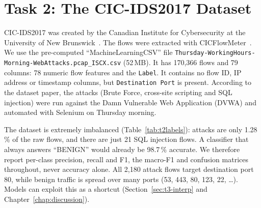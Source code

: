 \chapter{Task 2: The CIC-IDS2017 Dataset}\label{chap:task2_dataset}

CIC-IDS2017 was created by the Canadian Institute for Cybersecurity at the University of New Brunswick~\cite{sharafaldin2018cicids,cicids2017_web}. The flows were extracted with CICFlowMeter~\cite{lashkari2017cicflowmeter}. We use the pre-computed ``MachineLearningCSV'' file \texttt{Thursday-WorkingHours-Morning-WebAttacks.pcap\_ISCX.csv} (52\,MB). It has 170,366 flows and 79 columns: 78 numeric flow features and the \texttt{Label}. It contains no flow ID, IP address or timestamp columns, but \texttt{Destination Port} is present. According to the dataset paper, the attacks (Brute Force, cross-site scripting and SQL injection) were run against the Damn Vulnerable Web Application (DVWA) and automated with Selenium on Thursday morning.

The dataset is extremely imbalanced (Table~\ref{tab:t2labels}): attacks are only 1.28\,\% of the raw flows, and there are just 21 SQL injection flows. A classifier that always answers ``BENIGN'' would already be 98.7\,\% accurate. We therefore report per-class precision, recall and F1, the macro-F1 and confusion matrices throughout, never accuracy alone. All 2,180 attack flows target destination port 80, while benign traffic is spread over many ports (53, 443, 80, 123, 22, \ldots). Models can exploit this as a shortcut (Section~\ref{sec:t3-interp} and Chapter~\ref{chap:discussion}).

\begin{table}[ht]
	\centering\small
	
	\caption{Label distribution of the Thursday file, raw and after the cleaning steps of Chapter~\ref{chap:task3_preprocessing}.}
	\label{tab:t2labels}
\end{table}


\FloatBarrier
